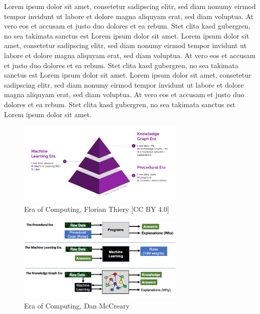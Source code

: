 \documentclass[twocolumn]{autart}
\begin{document}
Lorem ipsum dolor sit amet, consetetur sadipscing elitr, sed diam nonumy eirmod tempor invidunt ut labore et dolore magna aliquyam erat, sed diam voluptua. At vero eos et accusam et justo duo dolores et ea rebum. Stet clita kasd gubergren, no sea takimata sanctus est Lorem ipsum dolor sit amet. Lorem ipsum dolor sit amet, consetetur sadipscing elitr, sed diam nonumy eirmod tempor invidunt ut labore et dolore magna aliquyam erat, sed diam voluptua. At vero eos et accusam et justo duo dolores et ea rebum. Stet clita kasd gubergren, no sea takimata sanctus est Lorem ipsum dolor sit amet. Lorem ipsum dolor sit amet, consetetur sadipscing elitr, sed diam nonumy eirmod tempor invidunt ut labore et dolore magna aliquyam erat, sed diam voluptua. At vero eos et accusam et justo duo dolores et ea rebum. Stet clita kasd gubergren, no sea takimata sanctus est Lorem ipsum dolor sit amet. 

\cite{mccreary_computing}

\cite{hey_computing}

\begin{figure}[!htb]
\begin{center}
\includegraphics[width=8cm]{Era_of_Computing.png}    %
\caption{Era of Computing, Florian Thiery [CC BY 4.0]}  %
\label{figeoc}                                 %
\end{center}                                 %
\end{figure}

\begin{figure}[!htb]
\begin{center}
\includegraphics[width=8cm]{1_78b9DR1EApGRAst5FkPrwQ.png}    %
\caption{Era of Computing, Dan McCreary \cite{mccreary_computing}}  %
\label{figeoco}                                 %
\end{center}                                 %
\end{figure}
\end{document}
